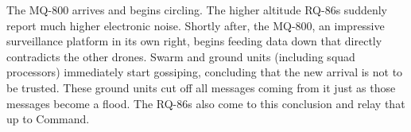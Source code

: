 The MQ-800 arrives and begins circling.
The higher altitude RQ-86s suddenly report much higher electronic noise.
Shortly after, the MQ-800, an impressive surveillance platform in its own right, begins feeding data down that directly contradicts the other drones.
Swarm and ground units (including squad processors) immediately start gossiping, concluding that the new arrival is not to be trusted.
These ground units cut off all messages coming from it just as those messages become a flood.
The RQ-86s also come to this conclusion and relay that up to Command.
